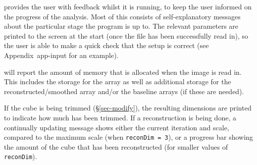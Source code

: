 %
%
%
%
\label{sec-output}


\duchamp provides the user with feedback whilst it is running, to
keep the user informed on the progress of the analysis. Most of this
consists of self-explanatory messages about the particular stage the
program is up to. The relevant parameters are printed to the screen at
the start (once the file has been successfully read in), so the user
is able to make a quick check that the setup is correct (see
Appendix~{app-input} for an example).

\duchamp will report the amount of memory that is allocated when the
image is read in. This includes the storage for the array as well as
additional storage for the reconstructed/smoothed array and/or the
baseline arrays (if these are needed).

If the cube is being trimmed (\S\ref{sec-modify}), the resulting
dimensions are printed to indicate how much has been trimmed. If a
reconstruction is being done, a continually updating message shows
either the current iteration and scale, compared to the maximum scale
(when \texttt{reconDim = 3}), or a progress bar showing the amount of
the cube that has been reconstructed (for smaller values of
\texttt{reconDim}).

